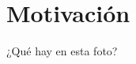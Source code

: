 \section{Motivación}


\begin{frame}{¿Qué hay en esta foto?}

    \begin{center}
    \end{center}

\end{frame}


\begin{frame}
    \begin{columns}
    \column{6cm}
        \pause
    \column{6cm}
    \end{columns}

\end{frame}




